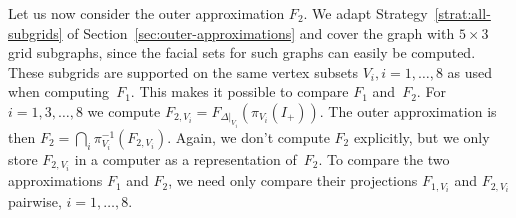 \documentclass[aos,noinfoline]{imsart}
\newcommand{\face}{F}
\theoremstyle{remark}
\theoremstyle{definition}
\begin{document}
Let us now consider the outer approximation $F_2$.  We adapt Strategy~\ref{strat:all-subgrids} of Section~\ref{sec:outer-approximations} and cover the graph with $5\times 3$ grid subgraphs, since the facial sets for such graphs can easily be computed.  
These subgrids are supported on the same vertex subsets $V_i, i=1,\ldots,8$ as used when computing~$F_{1}$.  This makes
it possible to compare $F_{1}$ and~$F_{2}$.
 For $i=1,3,\dots,8$ we compute
$F_{2,V_{i}}=\face_{\Delta|_{V_{i}}}(\pi_{V_{i}}(I_{+}))$.  The outer approximation is then
$F_{2}=\bigcap_{i}\pi_{V_{i}}^{-1}(F_{2,V_i})$. Again, we don't compute $F_{2}$ explicitly, but
we only store $F_{2,V_{i}}$ in a computer as a representation of~$F_{2}$.
%
To compare the two approximations $F_1$ and $F_2$, we need only compare their projections $F_{1,V_i}$ and $F_{2,V_i}$ pairwise, $i=1,\ldots, 8$.
\end{document}
